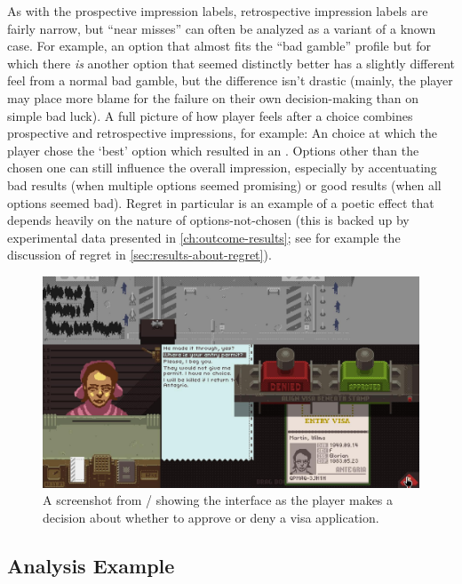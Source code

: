 As with the prospective impression labels, retrospective impression labels are fairly narrow, but ``near misses'' can often be analyzed as a variant of a known case.
%
For example, an option that almost fits the ``bad gamble'' profile but for which there \emph{is} another option that seemed distinctly better has a slightly different feel from a normal bad gamble, but the difference isn't drastic (mainly, the player may place more blame for the failure on their own decision-making than on simple bad luck).
%
A full picture of how player feels after a choice combines prospective and retrospective impressions, for example: An  choice at which the player chose the `best' option which resulted in an .
%
Options other than the chosen one can still influence the overall impression, especially by accentuating bad results (when multiple options seemed promising) or good results (when all options seemed bad).
%
Regret in particular is an example of a poetic effect that depends heavily on the nature of options-not-chosen (this is backed up by experimental data presented in \cref{ch:outcome-results}; see for example the discussion of regret in \cref{sec:results-about-regret}).


\begin{figure}[!b]
\centering
\includegraphics[width=\textwidth]{fig/papers-please-visa-choice.png}
\caption[Visa approval in \papersplease/]{A screenshot from \papersplease/ showing the interface as the player makes a decision about whether to approve or deny a visa application.}
\label{fig:visa-choice}
\end{figure}

\subsection{Analysis Example}
\label{sec:analysis-example}

